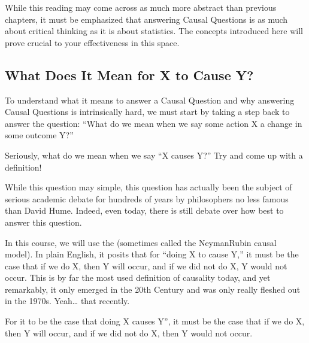 \documentclass[letterpaper,10pt,english]{jupyterBook}
\begin{document}
\sphinxAtStartPar
While this reading may come across as much more abstract than previous chapters, it must be emphasized that answering Causal Questions is as much about critical thinking as it is about statistics. The concepts introduced here will prove crucial to your effectiveness in this space.


\subsection{What Does It Mean for X to Cause Y?}
\label{\detokenize{30_questions/40_answering_causal_questions:what-does-it-mean-for-x-to-cause-y}}
\sphinxAtStartPar
To understand what it means to answer a Causal Question and why answering Causal Questions is intrinsically hard, we must start by taking a step back to answer the question: “What do we mean when we say some action X  a change in some outcome Y?”

\sphinxAtStartPar
Seriously, what do we mean when we say “X causes Y?” Try and come up with a definition!

\sphinxAtStartPar
While this question may  simple, this question has actually been the subject of serious academic debate for hundreds of years by philosophers no less famous than David Hume. Indeed, even today, there is still debate over how best to answer this question.

\sphinxAtStartPar
In this course, we will use the  (sometimes called the Neyman\sphinxhyphen{}Rubin causal model). In plain English, it posits that for “doing X to cause Y,” it must be the case that if we do X, then Y will occur, and if we did not do X, Y would not occur. This is by far the most used definition of causality today, and yet remarkably, it only emerged in the 20th Century and was only really fleshed out in the 1970s. Yeah… that recently.

\begin{sphinxShadowBox}

\sphinxAtStartPar
For it to be the case that doing X causes Y”, it must be the case that if we do X, then Y will occur, and if we did not do X, then Y would not occur.
\end{sphinxShadowBox}
\end{document}
